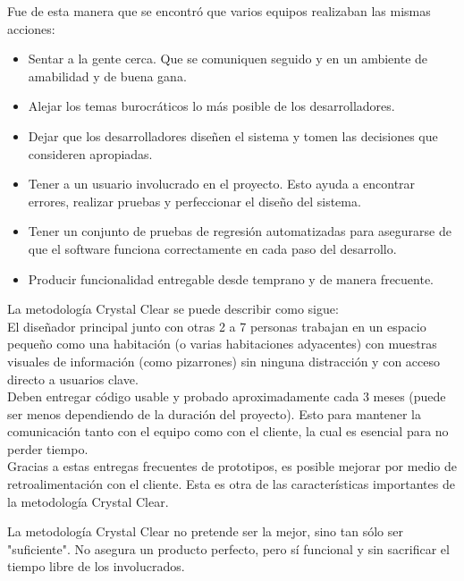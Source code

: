 \documentclass[12pt,a4paper]{article}
\begin{document}
	Fue de esta manera que se encontr\'o que varios equipos realizaban las mismas acciones:	
	\begin{itemize}
	\item Sentar a la gente cerca. Que se comuniquen seguido y en un ambiente de amabilidad y de buena gana.
	
	\item Alejar los temas burocr\'aticos lo m\'as posible de los desarrolladores.
	
 	\item Dejar que los desarrolladores dise\~nen el sistema y tomen las decisiones que consideren apropiadas.
	
	\item Tener a un usuario involucrado en el proyecto. Esto ayuda a encontrar errores, realizar pruebas y perfeccionar el dise\~no del sistema.
	
	\item Tener un conjunto de pruebas de regresi\'on automatizadas para asegurarse de que el software funciona correctamente en cada paso del desarrollo.
	
	\item Producir funcionalidad entregable desde temprano y de manera frecuente.
	\\
	\end{itemize}
					
	La metodolog\'ia Crystal Clear se puede describir como sigue:\\
	
	El dise\~nador principal junto con otras 2 a 7 personas trabajan en un espacio peque\~no como una habitaci\'on (o varias habitaciones adyacentes) con muestras visuales de informaci\'on (como pizarrones) sin ninguna distracci\'on y con acceso directo a usuarios clave.\\
	
	Deben entregar c\'odigo usable y probado aproximadamente cada 3 meses (puede ser menos dependiendo de la duraci\'on del proyecto). Esto para mantener la comunicaci\'on tanto con el equipo como con el cliente, la cual es esencial para no perder tiempo.\\
	
	Gracias a estas entregas frecuentes de prototipos, es posible mejorar por medio de retroalimentaci\'on con el cliente. Esta es otra de las caracter\'isticas importantes de la metodolog\'ia Crystal Clear.
	
	La metodolog\'ia Crystal Clear no pretende ser la mejor, sino tan s\'olo ser "suficiente". No asegura un producto perfecto, pero s\'i funcional y sin sacrificar el tiempo libre de los involucrados.\\
	
\end{document}
